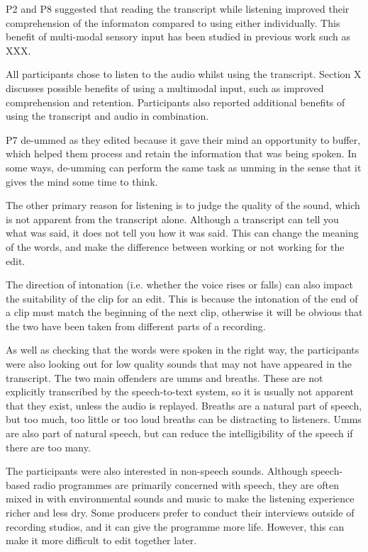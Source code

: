 P2 and P8 suggested that reading the transcript while listening improved their comprehension of the informaton compared
to using either individually. This benefit of multi-modal sensory input has been studied in previous work such as XXX.

All participants chose to listen to the audio whilst using the transcript. Section X discusses possible benefits of
using a multimodal input, such as improved comprehension and retention. Participants also reported additional benefits
of using the transcript and audio in combination.


P7 de-ummed as they edited because it gave their mind an opportunity to buffer, which helped them process and retain
the information that was being spoken. In some ways, de-umming can perform the same task as umming in the sense that it
gives the mind some time to think.


The other primary reason for listening is to judge the quality of the sound, which is not apparent from the transcript
alone. Although a transcript can tell you what was said, it does not tell you how it was said. This can change the
meaning of the words, and make the difference between working or not working for the edit.


The direction of intonation (i.e. whether the voice rises or falls) can also impact the suitability of the clip for an
edit. This is because the intonation of the end of a clip must match the beginning of the next clip, otherwise it will
be obvious that the two have been taken from different parts of a recording.


As well as checking that the words were spoken in the right way, the participants were also looking out for low quality
sounds that may not have appeared in the transcript. The two main offenders are umms and breaths. These are not
explicitly transcribed by the speech-to-text system, so it is usually not apparent that they exist, unless the audio is
replayed. Breaths are a natural part of speech, but too much, too little or too loud breaths can be distracting to
listeners. Umms are also part of natural speech, but can reduce the intelligibility of the speech if there are too
many.


The participants were also interested in non-speech sounds. Although speech-based radio programmes are primarily
concerned with speech, they are often mixed in with environmental sounds and music to make the listening experience
richer and less dry. Some producers prefer to conduct their interviews outside of recording studios, and it can give
the programme more life. However, this can make it more difficult to edit together later.

